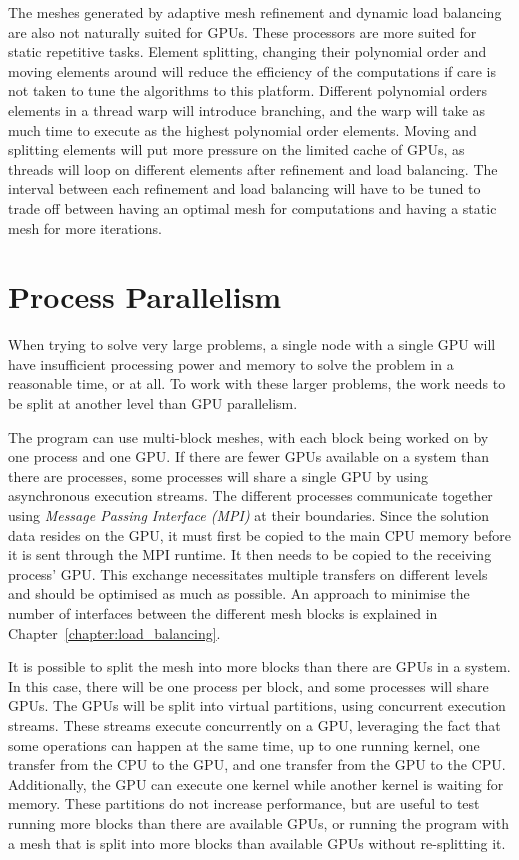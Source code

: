 The meshes generated by adaptive mesh refinement and dynamic load balancing are also not naturally
suited for GPUs. These processors are more suited for static repetitive tasks. Element splitting,
changing their polynomial order and moving elements around will reduce the efficiency of the
computations if care is not taken to tune the algorithms to this platform. Different polynomial
orders elements in a thread warp will introduce branching, and the warp will take as much time to
execute as the highest polynomial order elements. Moving and splitting elements will put more
pressure on the limited cache of GPUs, as threads will loop on different elements after refinement
and load balancing. The interval between each refinement and load balancing will have to be tuned to
trade off between having an optimal mesh for computations and having a static mesh for more
iterations.

\section{Process Parallelism} \label{section:graphics_processing_units:process_parallelism}

When trying to solve very large problems, a single node with a single GPU will have insufficient
processing power and memory to solve the problem in a reasonable time, or at all. To work with these
larger problems, the work needs to be split at another level than GPU parallelism.  

The program can use multi-block meshes, with each block being worked on by one process and one GPU.
If there are fewer GPUs available on a system than there are processes, some processes will share a
single GPU by using asynchronous execution streams. The different processes communicate together
using \textit{Message Passing Interface (MPI)} at their boundaries. Since the solution data resides
on the GPU, it must first be copied to the main CPU memory before it is sent through the MPI
runtime. It then needs to be copied to the receiving process' GPU. This exchange necessitates
multiple transfers on different levels and should be optimised as much as possible. An approach to
minimise the number of interfaces between the different mesh blocks is explained in
Chapter~\ref{chapter:load_balancing}. 

It is possible to split the mesh into more blocks than there are GPUs in a system. In this case,
there will be one process per block, and some processes will share GPUs. The GPUs will be split into
virtual partitions, using concurrent execution streams. These streams execute concurrently on a GPU,
leveraging the fact that some operations can happen at the same time, up to one running kernel, one
transfer from the CPU to the GPU, and one transfer from the GPU to the CPU. Additionally, the GPU
can execute one kernel while another kernel is waiting for memory. These partitions do not increase
performance, but are useful to test running more blocks than there are available GPUs, or running
the program with a mesh that is split into more blocks than available GPUs without re-splitting it.

